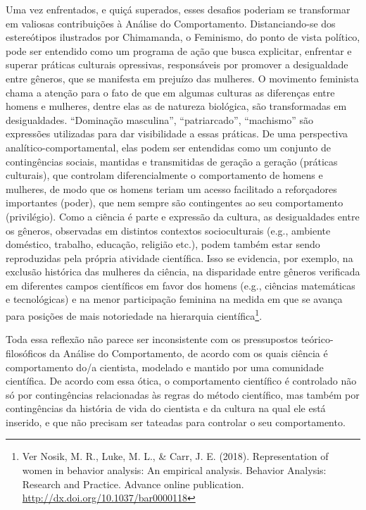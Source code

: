Uma vez enfrentados, e quiçá superados, esses desafios poderiam se transformar em valiosas contribuições à Análise do Comportamento. Distanciando-se dos estereótipos ilustrados por Chimamanda, o Feminismo, do ponto de vista político, pode ser entendido como um programa de ação que busca explicitar, enfrentar e superar práticas culturais opressivas, responsáveis por promover a desigualdade entre gêneros, que se manifesta em prejuízo das mulheres. O movimento feminista chama a atenção para o fato de que em algumas culturas as diferenças entre homens e mulheres, dentre elas as de natureza biológica, são transformadas em desigualdades. “Dominação masculina”, “patriarcado”, “machismo” são expressões utilizadas para dar visibilidade a essas práticas. De uma perspectiva analítico-comportamental, elas podem ser entendidas como um conjunto de contingências sociais, mantidas e transmitidas de geração a geração (práticas culturais), que controlam diferencialmente o comportamento de homens e mulheres, de modo que os homens teriam um acesso facilitado a reforçadores importantes (poder), que nem sempre são contingentes ao seu comportamento (privilégio). 
Como a ciência é parte e expressão da cultura, as desigualdades entre os gêneros, observadas em distintos contextos socioculturais (e.g., ambiente doméstico, trabalho, educação, religião etc.), podem também estar sendo reproduzidas pela própria atividade científica. Isso se evidencia, por exemplo, na exclusão histórica das mulheres da ciência, na disparidade entre gêneros verificada em diferentes campos científicos em favor dos homens (e.g., ciências matemáticas e tecnológicas) e na menor participação feminina na medida em que se avança para posições de mais notoriedade na hierarquia científica\footnote{Ver Nosik, M. R., Luke, M. L., \& Carr, J. E. (2018). Representation of women in behavior analysis: An empirical analysis. Behavior Analysis: Research and Practice. Advance online publication. \url{http://dx.doi.org/10.1037/bar0000118}}. 

Toda essa reflexão não parece ser inconsistente com os pressupostos teórico-filosóficos da Análise do Comportamento, de acordo com os quais ciência é comportamento do/a cientista, modelado e mantido por uma comunidade científica. De acordo com essa ótica, o comportamento científico é controlado não só por contingências relacionadas às regras do método científico, mas também por contingências da história de vida do cientista e da cultura na qual ele está inserido, e que não precisam ser tateadas para controlar o seu comportamento.

